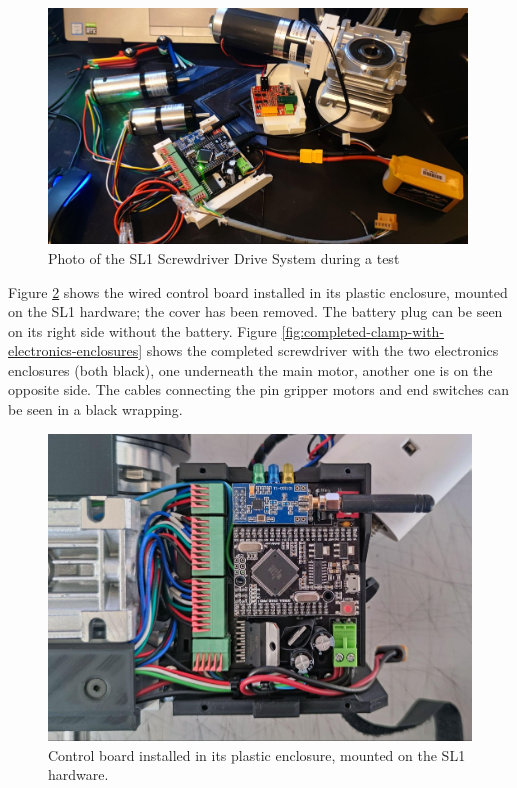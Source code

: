 \begin{figure}[!h]
    \centering
    \includegraphics[width=0.99\textwidth]{images/7a/img67.jpg}
    \caption{Photo of the SL1 Screwdriver Drive System during a test}
    \label{fig:sl1-screwdriver-electronics-during-a-test}
\end{figure}


Figure \ref{fig:control-in-its-enclosure-in-hardware} shows the wired control board installed in its plastic enclosure, mounted on the SL1 hardware; the cover has been removed. The battery plug can be seen on its right side without the battery. Figure \ref{fig:completed-clamp-with-electronics-enclosures} shows the completed screwdriver with the two electronics enclosures (both black), one underneath the main motor, another one is on the opposite side. The cables connecting the pin gripper motors and end switches can be seen in a black wrapping.


\begin{figure}[!h]
    \centering
    \includegraphics[width=\textwidth]{images/7a/img68.jpg}
    \caption{Control board installed in its plastic enclosure, mounted on the SL1 hardware.}
    \label{fig:control-in-its-enclosure-in-hardware}
\end{figure}

